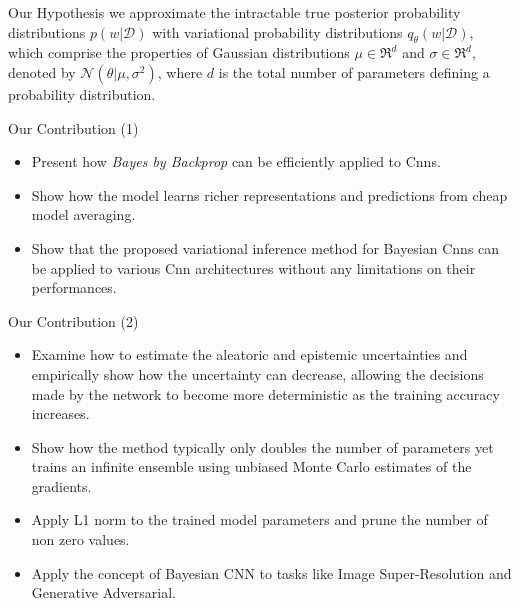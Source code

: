 \documentclass{beamer}
\begin{document}
\begin{frame}{Our Hypothesis}
  we approximate the intractable true posterior probability distributions $p(w|\mathcal{D})$
  with variational probability distributions $q_\theta(w|\mathcal{D})$,
  which comprise the properties of Gaussian distributions $\mu \in \Re^d$ and $\sigma \in \Re^d$,
  denoted by $\mathcal{N}(\theta|\mu, \sigma^2)$, where $d$ is the total number of parameters defining a probability distribution. 
\end{frame}
\begin{frame}{Our Contribution (1)}
  \begin{itemize}
    \item<1-> Present how \textit{Bayes by Backprop} can be efficiently applied to Cnns.
    \item<1-> Show how the model learns richer representations and predictions from cheap model
    averaging.
    \item<1-> Show that the proposed variational inference method for Bayesian Cnns can be applied to various Cnn architectures without any limitations
    on their performances.
  \end{itemize}
\end{frame}
\begin{frame}{Our Contribution (2)}
  \begin{itemize}
    \item<1-> Examine how to estimate the aleatoric and epistemic uncertainties and empirically
    show how the uncertainty can decrease, allowing the decisions made by the network to
    become more deterministic as the training accuracy increases.
    \item<1-> Show how the method typically only doubles the number of parameters yet trains an infinite ensemble using unbiased Monte Carlo estimates of the
    gradients.
    \item<1-> Apply L1 norm to the trained model parameters and prune the number of non
    zero values.
    \item<1-> Apply the concept of Bayesian CNN to tasks like Image Super-Resolution
    and Generative Adversarial.
  \end{itemize}
\end{frame}

\end{document}
